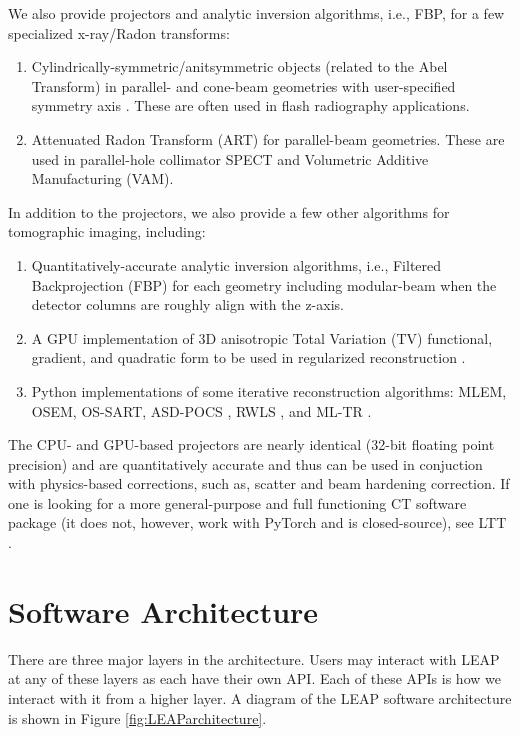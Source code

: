 \documentclass[11pt]{article}
\begin{document}
We also provide projectors and analytic inversion algorithms, i.e., FBP, for a few specialized x-ray/Radon transforms:
\begin{enumerate}
\item Cylindrically-symmetric/anitsymmetric objects (related to the Abel Transform) in parallel- and cone-beam geometries with user-specified symmetry axis \cite{ChampleyMaddox_Optica_2021}. These are often used in flash radiography applications.
\item Attenuated Radon Transform (ART) for parallel-beam geometries. These are used in parallel-hole collimator SPECT and Volumetric Additive Manufacturing (VAM).
\end{enumerate}

In addition to the projectors, we also provide a few other algorithms for tomographic imaging, including:
\begin{enumerate}
\item Quantitatively-accurate analytic inversion algorithms, i.e., Filtered Backprojection (FBP) for each geometry including modular-beam when the detector columns are roughly align with the z-axis.
\item A GPU implementation of 3D anisotropic Total Variation (TV) functional, gradient, and quadratic form to be used in regularized reconstruction \cite{Yu_MIC_2006}.
\item Python implementations of some iterative reconstruction algorithms: MLEM, OSEM, OS-SART, ASD-POCS \cite{ASDPOCS_PMB_2008}, RWLS \cite{Hager_Zhang_CG_2005, Fessler_TIP_1999, Yu_MIC_2006}, and ML-TR \cite{IMPACT_TMI_2001}.
\end{enumerate}

The CPU- and GPU-based projectors are nearly identical (32-bit floating point precision) and are quantitatively accurate and thus can be used in conjuction with physics-based corrections, such as, scatter and beam hardening correction. If one is looking for a more general-purpose and full functioning CT software package (it does not, however, work with PyTorch and is closed-source), see LTT \cite{ChampleyLTT}.

\section{Software Architecture}

There are three major layers in the architecture.  Users may interact with LEAP at any of these layers as each have their own API.  Each of these APIs is how we interact with it from a higher layer.  A diagram of the LEAP software architecture is shown in Figure \ref{fig:LEAParchitecture}.
\end{document}
